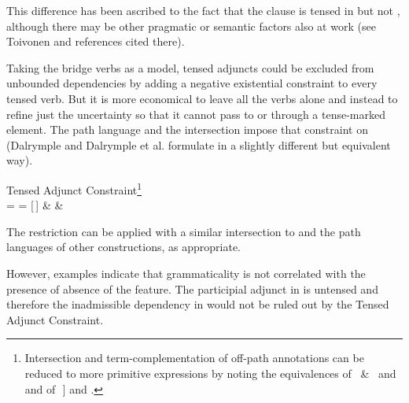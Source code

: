 \documentclass[output=paper,hidelinks]{langscibook}
\begin{document}
\ea\label{tensedadj}
\label{untensedadj1}
\label{tenseadj1}
\label{tenseadj2}
\z\z

\noindent This difference has been ascribed to the fact that the \ADJ clause is tensed in  but not  , although there may be other pragmatic or semantic factors also at work  (see Toivonen \citeyear{toivonen:2021} and references cited there). 

Taking the bridge verbs as a model, tensed adjuncts could be excluded from unbounded dependencies by adding a negative existential constraint  to every tensed verb.   But it is more economical to leave all the verbs alone and instead to refine just the uncertainty so that it cannot pass to or through a tense-marked  \ADJ element.   The path language  and the intersection  impose that constraint on  (Dalrymple \citeyear{dalrymple01} and Dalrymple et al. \citeyear{DLM:LFG} formulate  in a slightly different but equivalent way).   

\ea\label{adjpaths}Tensed Adjunct Constraint\footnote{Intersection and term-complementation of off-path annotations can be reduced to more primitive expressions by noting the equivalences of \mbox{ \& } and \mbox{}\hsp{-.1667em}and of\, \mbox{\termcomp{\ [\,\offp{$a$}{\scriptsize $D$}}\,]} and .}\\

\ea\label{tac}  = \kstar
\ex\label{plustac} = [\,\set{\COMP, \XCOMP, \ADJ\ (\in)}\kstar  {}] \&  \& 
\z\z

\noindent  The  restriction can be applied with a similar intersection to  and the path languages of other constructions, as appropriate.

However, examples  indicate that grammaticality is not correlated with the presence of absence of the \TENSE feature.  The participial adjunct in  is untensed and therefore the inadmissible dependency in  would not be ruled out by the Tensed Adjunct Constraint.   
\end{document}
